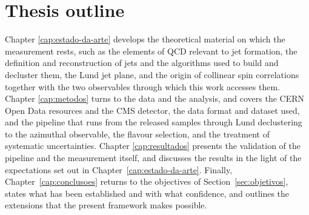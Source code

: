 \section{Thesis outline}
\label{sec:estrutura}

Chapter \ref{cap:estado-da-arte} develops the theoretical material on which the
measurement rests, such as the elements of QCD relevant to jet formation, the
definition and reconstruction of jets and the algorithms used to build and
decluster them, the Lund jet plane, and the origin of collinear spin
correlations together with the two observables through which this work accesses
them. Chapter \ref{cap:metodos} turns to the data and the analysis, and covers the CERN
Open Data resources and the CMS detector, the data format and
dataset used, and the pipeline that runs from the released samples through Lund
declustering to the azimuthal observable, the flavour selection, and the
treatment of systematic uncertainties. Chapter \ref{cap:resultados} presents the
validation of the pipeline and the measurement itself, and discusses the results
in the light of the expectations set out in
Chapter~\ref{cap:estado-da-arte}. Finally,
Chapter~\ref{cap:conclusoes} returns to the objectives of
Section~\ref{sec:objetivos}, states what has been established and with what
confidence, and outlines the extensions that the present framework makes
possible.

